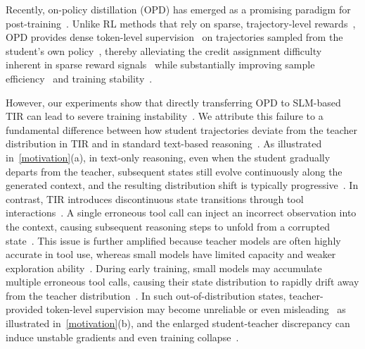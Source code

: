 Recently, on-policy distillation (OPD) has emerged as a promising paradigm for post-training~\citep{opd,gu2024minillm,eopd,ropd,lightOPD}. Unlike RL methods that rely on sparse, trajectory-level rewards~\citep{deepseek2025r1}, OPD provides dense token-level supervision~\citep{gu2024minillm} on trajectories sampled from the student's own policy~\citep{opd}, thereby alleviating the credit assignment difficulty inherent in sparse reward signals~\citep{qwen2025qwen3,li2026rethinking} while substantially improving sample efficiency~\citep{xu2026rlkd} and training stability~\citep{qwen2025qwen3}.














However, our experiments show that directly transferring OPD to SLM-based TIR can lead to severe training instability~\citep{srpo,sdrlvr,bousselham2025vold,wang2026openclaw}. We attribute this failure to a fundamental difference between how student trajectories deviate from the teacher distribution in TIR and in standard text-based reasoning~\citep{li2026rethinking,fu2026revisiting,opdsurvey,bousselham2025vold}. As illustrated in~\cref{motivation}(a), in text-only reasoning, even when the student gradually departs from the teacher, subsequent states still evolve continuously along the generated context, and the resulting distribution shift is typically progressive~\citep{ross2011reduction,opd}. In contrast, TIR introduces discontinuous state transitions through tool interactions~\citep{li2025torl}. A single erroneous tool call can inject an incorrect observation into the context, causing subsequent reasoning steps to unfold from a corrupted state~\citep{qian2025toolrl}. This issue is further amplified because teacher models are often highly accurate in tool use, whereas small models have limited capacity and weaker exploration ability~\citep{gudibande2024false,rainone2025replacing}. During early training, small models may accumulate multiple erroneous tool calls, causing their state distribution to rapidly drift away from the teacher distribution~\citep{li2026rethinking,wang2026tcod}. In such out-of-distribution states, teacher-provided token-level supervision may become unreliable or even misleading~\citep{veto,bousselham2025vold,kepo,tip,srpo} as illustrated in~\cref{motivation}(b), and the enlarged student-teacher discrepancy can induce unstable gradients and even training collapse~\citep{li2026rethinking,qwen2025qwen3}.


